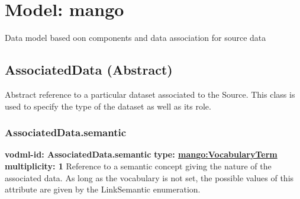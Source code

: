 
%



    
    
    
    
    
    
      

\pagebreak
\section{Model: mango }
  

  Data model based oon components and data association for source data

  \subsection{AssociatedData (Abstract)}
  \label{sect:AssociatedData}
    Abstract reference to a particular dataset associated to the Source. This class is used to specify the type of the dataset as well as its role.

    \subsubsection{AssociatedData.semantic}
      \textbf{vodml-id: AssociatedData.semantic} \newline
      \textbf{type: \hyperref[sect:VocabularyTerm]{mango:VocabularyTerm}} \newline
      \textbf{multiplicity: 1} \newline 
      Reference to a semantic concept giving the nature of the associated data. As long as the vocabulary is not set, the possible values of this attribute are given by the LinkSemantic enumeration.

